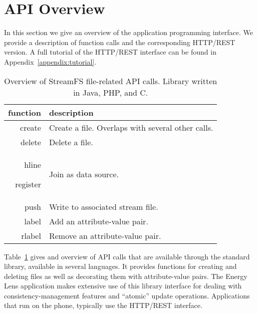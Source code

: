 \section{API Overview}

In this section we give an overview of the application programming interface.  We provide a description of
function calls and the corresponding HTTP/REST version.  A full tutorial of the HTTP/REST interface can be found 
in Appendix~\ref{appendix:tutorial}.

\begin{table}[h]
\begin{center}
\begin{tabular}{| r | l |}
	\hline
	\textbf{function} & \textbf{description} \\ \hline
	create & Create a file. Overlaps with several other calls.    \\ \hline

	delete & Delete a file. \\ hline

	register & Join as data source.    \\ \hline

	push & Write to associated stream file.  \\ \hline

	label & Add an attribute-value pair.  \\ \hline

	rlabel & Remove an attribute-value pair.  \\ \hline
\end{tabular}
\caption{Overview of StreamFS file-related API calls.  Library written in Java, PHP, and C.}
\label{tab:api_calls1}
\end{center}
\end{table}

Table~\ref{tab:api_calls1} gives and overview of API calls that are available through the standard library, available in several
languages.  It provides functions for creating and deleting files as well as decorating them with attribute-value pairs.
The Energy Lens application makes extensive use of this library interface for dealing with consistency-management
features and ``atomic'' update operations.  Applications that run on the phone, typically use the HTTP/REST
interface.


